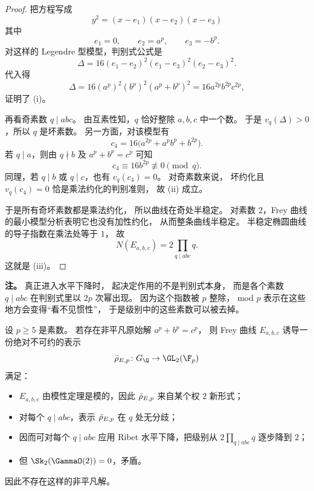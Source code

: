 \begin{proof}
把方程写成
\[
  y^2=(x-e_1)(x-e_2)(x-e_3)
\]
其中
\[
  e_1=0,
  \qquad e_2=a^p,
  \qquad e_3=-b^p.
\]
对这样的 Legendre 型模型，判别式公式是
\[
  \Delta=16(e_1-e_2)^2(e_1-e_3)^2(e_2-e_3)^2.
\]
代入得
\[
  \Delta=16(a^p)^2(b^p)^2(a^p+b^p)^2
  =16a^{2p}b^{2p}c^{2p},
\]
证明了 (i)。

再看奇素数 $q\mid abc$。
由互素性知，$q$ 恰好整除 $a,b,c$ 中一个数。
于是 $v_q(\Delta)>0$，所以 $q$ 是坏素数。
另一方面，对该模型有
\[
  c_4=16\bigl(a^{2p}+a^pb^p+b^{2p}\bigr).
\]
若 $q\mid a$，则由 $q\nmid b$ 及 $a^p+b^p=c^p$ 可知
\[
  c_4\equiv 16b^{2p}\not\equiv 0\pmod q.
\]
同理，若 $q\mid b$ 或 $q\mid c$，也有 $v_q(c_4)=0$。
对奇素数来说，
坏约化且 $v_q(c_4)=0$ 恰是乘法约化的判别准则，
故 (ii) 成立。

于是所有奇坏素数都是乘法约化，
所以曲线在奇处半稳定。
对素数 $2$，Frey 曲线的最小模型分析表明它也没有加性约化，
从而整条曲线半稳定。
半稳定椭圆曲线的导子指数在乘法处等于 $1$，
故
\[
  N(E_{a,b,c})=2\prod_{q\mid abc}q.
\]
这就是 (iii)。
\end{proof}

\textbf{注。}
真正进入水平下降时，
起决定作用的不是判别式本身，
而是各个素数 $q\mid abc$ 在判别式里以 $2p$ 次幂出现。
因为这个指数被 $p$ 整除，
mod $p$ 表示在这些地方会变得“看不见惯性”，
于是级别中的这些素数可以被去掉。

\begin{theorem}
\label{thm:ch09-flt-strategy}
设 $p\ge 5$ 是素数。
若存在非平凡原始解 $a^p+b^p=c^p$，
则 Frey 曲线 $E_{a,b,c}$ 诱导一份绝对不可约的表示
\[
  \rhobar_{E,p}\colon G_\Q\to \GL_2(\F_p)
\]
满足：
\begin{itemize}
  \item[(i)] $E_{a,b,c}$ 由模性定理是模的，因此 $\bar{\rho}_{E,p}$ 来自某个权 $2$ 新形式；
  \item[(ii)] 对每个 $q\mid abc$，表示 $\bar{\rho}_{E,p}$ 在 $q$ 处无分歧；
  \item[(iii)] 因而可对每个 $q\mid abc$ 应用 Ribet 水平下降，把级别从 $2\prod_{q\mid abc}q$ 逐步降到 $2$；
  \item[(iv)] 但 $\Sk_2(\GammaO(2))=0$，矛盾。
\end{itemize}
因此不存在这样的非平凡解。
\end{theorem}

